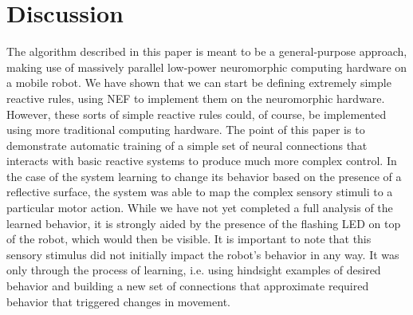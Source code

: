 \documentclass[conference]{IEEEtran}
\begin{document}
\section{Discussion}
The algorithm described in this paper is meant to be a general-purpose approach, making use of massively parallel low-power neuromorphic computing hardware on a mobile robot. We have shown that we can start be defining extremely simple reactive rules, using NEF to implement them on the neuromorphic hardware. However, these sorts of simple reactive rules could, of course, be implemented using more traditional computing hardware. The point of this paper is to demonstrate automatic training of a simple set of neural connections that interacts with basic reactive systems to produce much more complex control.
In the case of the system learning to change its behavior based on the presence of a reflective surface, the system was able to map the complex sensory stimuli to a particular motor action. While we have not yet completed a full analysis of the learned behavior, it is strongly aided by the presence of the flashing LED on top of the robot, which would then be visible. It is important to note that this sensory stimulus did not initially impact the robot's behavior in any way. It was only through the process of learning, i.e. using hindsight examples of desired behavior and building a new set of connections that approximate required behavior that triggered changes in movement.
\end{document}
